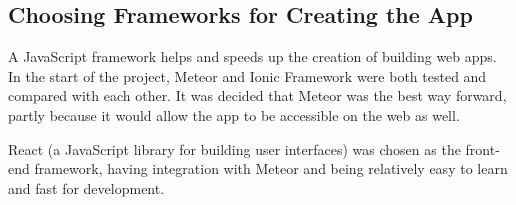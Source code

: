 
\subsection{Choosing Frameworks for Creating the App}

A JavaScript framework helps and speeds up the creation of building web apps. In the start of the project, Meteor \citep{meteor} and Ionic Framework \citep{ionic} were both tested and compared with each other. It was decided that Meteor was the best way forward, partly because it would allow the app to be accessible on the web as well. %

React \citep{react} (a JavaScript library for building user interfaces) was chosen as the front-end framework, having integration with Meteor and being relatively easy to learn and fast for development.
